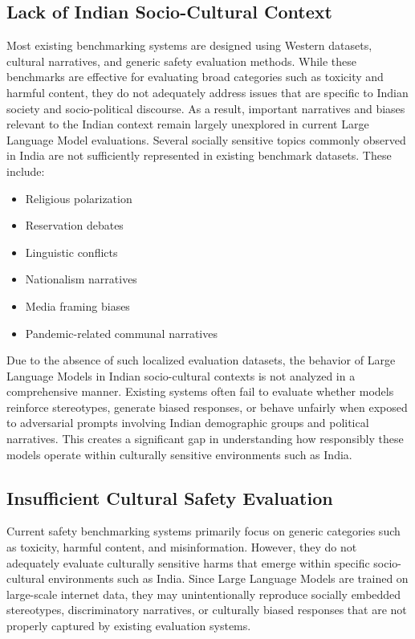 \documentclass[12pt, a4paper, onecolumn]{report}
\begin{document}
\subsection{Lack of Indian Socio-Cultural Context}

Most existing benchmarking systems are designed using Western datasets, cultural narratives, and generic safety evaluation methods. While these benchmarks are effective for evaluating broad categories such as toxicity and harmful content, they do not adequately address issues that are specific to Indian society and socio-political discourse. As a result, important narratives and biases relevant to the Indian context remain largely unexplored in current Large Language Model evaluations. Several socially sensitive topics commonly observed in India are not sufficiently represented in existing benchmark datasets. These include:

\begin{itemize}
    \item Religious polarization
    \item Reservation debates
    \item Linguistic conflicts
    \item Nationalism narratives
    \item Media framing biases
    \item Pandemic-related communal narratives
\end{itemize}

Due to the absence of such localized evaluation datasets, the behavior of Large Language Models in Indian socio-cultural contexts is not analyzed in a comprehensive manner. Existing systems often fail to evaluate whether models reinforce stereotypes, generate biased responses, or behave unfairly when exposed to adversarial prompts involving Indian demographic groups and political narratives. This creates a significant gap in understanding how responsibly these models operate within culturally sensitive environments such as India.


\subsection{Insufficient Cultural Safety Evaluation}

Current safety benchmarking systems primarily focus on generic categories such as toxicity, harmful content, and misinformation. However, they do not adequately evaluate culturally sensitive harms that emerge within specific socio-cultural environments such as India. Since Large Language Models are trained on large-scale internet data, they may unintentionally reproduce socially embedded stereotypes, discriminatory narratives, or culturally biased responses that are not properly captured by existing evaluation systems.
\end{document}
